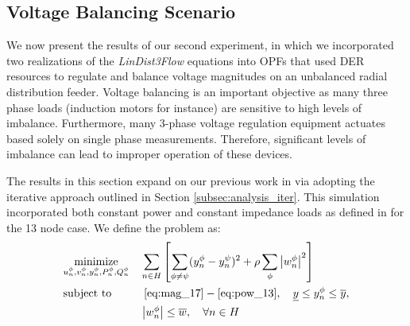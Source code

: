 \subsection{Voltage Balancing Scenario} \label{sec:sim_voltage_balance}

We now present the results of our second experiment, in which we incorporated two realizations of the \textit{LinDist3Flow} equations into OPFs that used DER resources to regulate and balance voltage magnitudes on an unbalanced radial distribution feeder.  Voltage balancing is an important objective as many three phase loads (induction motors for instance) are sensitive to high levels of imbalance.  Furthermore, many 3-phase voltage regulation equipment actuates based solely on single phase measurements.  Therefore, significant levels of imbalance can lead to improper operation of these devices. 

The results in this section expand on our previous work in \cite{arnold2015optimal} via adopting the iterative approach outlined in Section \ref{subsec:analysis_iter}. This simulation incorporated both constant power and constant impedance loads as defined in \cite{IEEEtestfeeder} for the 13 node case.  We define the problem as:
\begin{align}
  & \underset{u_{n}^{\phi},v_{n}^{\phi},y_{n}^{\phi},P_{n}^{\phi},Q_{n}^{\phi}} {\text{minimize}}
  & & \sum_{n \in H} \left[ \sum_{\phi \neq \psi} ( y_{n}^{\phi} - y_{n}^{\psi} )^{2} + \rho \sum_{\phi} \left| w_{n}^{\phi} \right|^{2} \right] \nonumber \\
  & \text{subject to}
  & & ~\eqref{eq:mag_17}-\eqref{eq:pow_13}, \quad \underline{y} \le y_{n}^{\phi} \le \overline{y}, \nonumber \\
  & & & \left| w_{n}^{\phi} \right| \le \overline{w}, \quad \forall n \in H 
\label{eq:OPF2}
\end{align}

